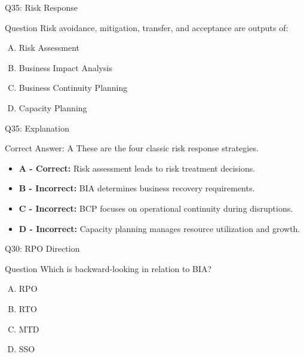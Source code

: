 \documentclass{beamer}
\begin{document}
	\begin{frame}{Q35: Risk Response}
		\begin{block}{Question}
			Risk avoidance, mitigation, transfer, and acceptance are outputs of:
		\end{block}
		
		\begin{enumerate}[(A)]
			\item Risk Assessment
			\item Business Impact Analysis
			\item Business Continuity Planning
			\item Capacity Planning
		\end{enumerate}
	\end{frame}
	
	\begin{frame}{Q35: Explanation}
		\begin{block}{Correct Answer: A}
			These are the four classic risk response strategies.
		\end{block}
		
		\begin{itemize}
			\item \textbf{A - Correct:} Risk assessment leads to risk treatment decisions.
			\item \textbf{B - Incorrect:} BIA determines business recovery requirements.
			\item \textbf{C - Incorrect:} BCP focuses on operational continuity during disruptions.
			\item \textbf{D - Incorrect:} Capacity planning manages resource utilization and growth.
		\end{itemize}
	\end{frame}
	
	
	\begin{frame}{Q30: RPO Direction}
		\begin{block}{Question}
			Which is backward-looking in relation to BIA?
		\end{block}
		\begin{enumerate}[(A)]
			\item RPO
			\item RTO
			\item MTD
			\item SSO
		\end{enumerate}
	\end{frame}
	
\end{document}
